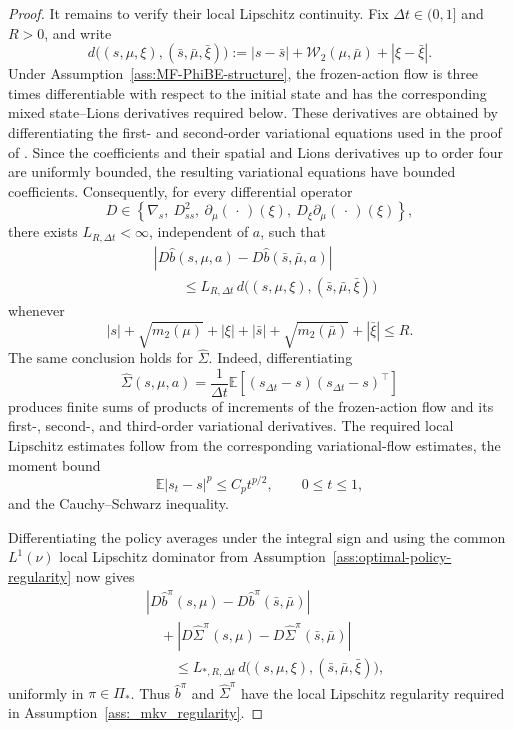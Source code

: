 \documentclass[a4paper, 10pt, english, reqno]{amsart}
\begin{document}
\begin{proof}
It remains to verify their local Lipschitz continuity. Fix
$\Delta t\in(0,1]$ and $R>0$, and write
\[
d\bigl((s,\mu,\xi),(\bar s,\bar\mu,\bar\xi)\bigr)
:=
|s-\bar s|+\mathcal W_2(\mu,\bar\mu)+|\xi-\bar\xi|.
\]
Under Assumption~\ref{ass:MF-PhiBE-structure}, the frozen-action flow is
three times differentiable with respect to the initial state and has the
corresponding mixed state--Lions derivatives required below. These
derivatives are obtained by differentiating the first- and second-order
variational equations used in the proof of
. Since the coefficients
and their spatial and Lions derivatives up to order four are uniformly
bounded, the resulting variational equations have bounded coefficients.
Consequently, for every differential operator
\[
D\in
\left\{
\nabla_s,\ D_{ss}^2,\ \partial_\mu(\,\cdot\,)(\xi),\
D_\xi\partial_\mu(\,\cdot\,)(\xi)
\right\},
\]
there exists $L_{R,\Delta t}<\infty$, independent of $a$, such that
\[
\begin{aligned}
&\left|
D\hat b(s,\mu,a)-D\hat b(\bar s,\bar\mu,a)
\right|
\\
&\qquad\le
L_{R,\Delta t}\,
d\bigl((s,\mu,\xi),(\bar s,\bar\mu,\bar\xi)\bigr)
\end{aligned}
\]
whenever
\[
|s|+\sqrt{m_2(\mu)}+|\xi|
+
|\bar s|+\sqrt{m_2(\bar\mu)}+|\bar\xi|
\le R.
\]
The same conclusion holds for $\hat\Sigma$. Indeed, differentiating
\[
\hat\Sigma(s,\mu,a)
=
\frac1{\Delta t}
\mathbb E\!\left[
(s_{\Delta t}-s)(s_{\Delta t}-s)^\top
\right]
\]
produces finite sums of products of increments of the frozen-action
flow and its first-, second-, and third-order variational derivatives.
The required local Lipschitz estimates follow from the corresponding
variational-flow estimates, the moment bound
\[
\mathbb E|s_t-s|^p\le C_p t^{p/2},
\qquad 0\le t\le1,
\]
and the Cauchy--Schwarz inequality.

Differentiating the policy averages under the integral sign and using
the common $L^1(\nu)$ local Lipschitz dominator from
Assumption~\ref{ass:optimal-policy-regularity} now gives
\[
\begin{aligned}
&\left|
D\hat b^\pi(s,\mu)-D\hat b^\pi(\bar s,\bar\mu)
\right|
\\
&\quad+
\left|
D\hat\Sigma^\pi(s,\mu)-D\hat\Sigma^\pi(\bar s,\bar\mu)
\right|
\\
&\qquad\le
L_{*,R,\Delta t}\,
d\bigl((s,\mu,\xi),(\bar s,\bar\mu,\bar\xi)\bigr),
\end{aligned}
\]
uniformly in $\pi\in\Pi_*$. Thus $\hat b^\pi$ and
$\hat\Sigma^\pi$ have the local Lipschitz regularity required in
Assumption~\ref{ass:_mkv_regularity}.


\end{proof}
\end{document}
